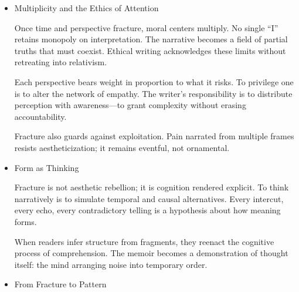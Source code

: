 \documentclass[11pt]{article}
\begin{document}
\begin{itemize}
Instability demands rigor. Four principles keep fracture from collapse:

\begin{enumerate}
\item \textbf{Maintain local clarity.} Each scene must be internally whole even if the global timeline is broken.
\item \textbf{Signal transitions economically.} A repeated sentence, a shift in diction, or a sensory echo can suffice.
\item \textbf{Preserve causal integrity.} Rearrange order, but do not falsify relation.
\item \textbf{Respect negative space.} Silence should read as chosen, not as neglect.
\end{enumerate}

These formal disciplines correspond to cognitive virtues: attention, discrimination, memory of context, and tolerance for ambiguity. They make discontinuity intelligible.
\item Multiplicity and the Ethics of Attention
\label{sec:org869e2f8}

Once time and perspective fracture, moral centers multiply. No single “I” retains monopoly on interpretation. The narrative becomes a field of partial truths that must coexist. Ethical writing acknowledges these limits without retreating into relativism.

Each perspective bears weight in proportion to what it risks. To privilege one is to alter the network of empathy. The writer’s responsibility is to distribute perception with awareness—to grant complexity without erasing accountability.

Fracture also guards against exploitation. Pain narrated from multiple frames resists aestheticization; it remains eventful, not ornamental.
\item Form as Thinking
\label{sec:org96bc55f}

Fracture is not aesthetic rebellion; it is cognition rendered explicit. To think narratively is to simulate temporal and causal alternatives. Every intercut, every echo, every contradictory telling is a hypothesis about how meaning forms.

When readers infer structure from fragments, they reenact the cognitive process of comprehension. The memoir becomes a demonstration of thought itself: the mind arranging noise into temporary order.
\item From Fracture to Pattern
\label{sec:org1f4e1c0}


\end{itemize}
\end{document}
